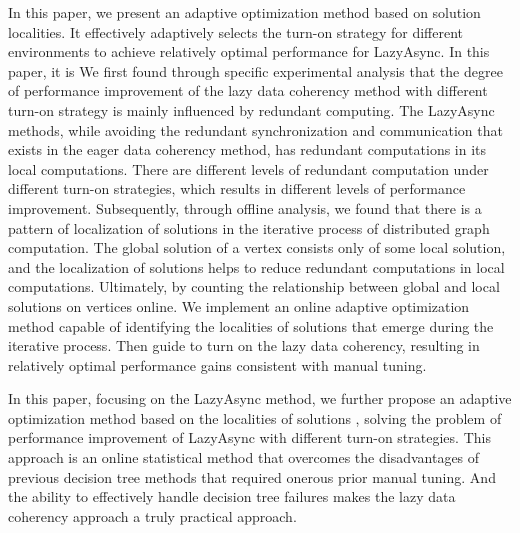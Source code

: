 In this paper, we present an adaptive optimization method based on solution localities.
It effectively adaptively selects the turn-on strategy for different environments to achieve relatively optimal performance for LazyAsync.
In this paper, it is 
We first found through specific experimental analysis that the degree of performance improvement of the lazy data coherency method with different turn-on strategy is mainly influenced by redundant computing.
The LazyAsync methods, while avoiding the redundant synchronization and communication that exists in the eager data coherency method, has redundant computations in its local computations.
There are different levels of redundant computation under different turn-on strategies, which results in different levels of performance improvement.
Subsequently, through offline analysis, we found that there is a pattern of localization of solutions in the iterative process of distributed graph computation.
The global solution of a vertex consists only of some local solution, and the localization of solutions helps to reduce redundant computations in local computations.
Ultimately, by counting the relationship between global and local solutions on vertices online.
We implement an online adaptive optimization method capable of identifying the localities of  solutions that emerge during the iterative process.
Then guide to turn on the lazy data coherency, resulting in relatively optimal performance gains consistent with manual tuning.

In this paper, focusing on the LazyAsync method, we further propose an adaptive optimization method based on  the localities of  solutions ,
solving the problem of performance improvement of LazyAsync with different turn-on strategies.
This approach is an online statistical method that overcomes the disadvantages of previous decision tree methods that required onerous prior manual tuning.
And the ability to effectively handle decision tree failures makes the lazy data coherency approach a truly practical approach.




